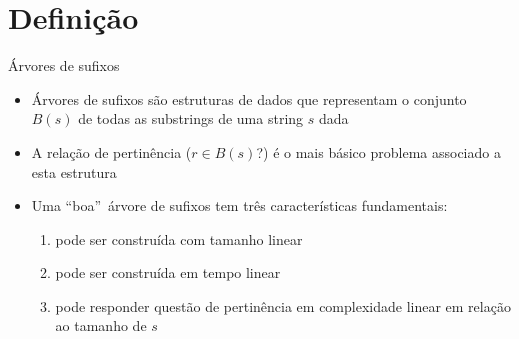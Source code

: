 \section{Definição}

\begin{frame}[fragile]{Árvores de sufixos}

    \begin{itemize}
        \item Árvores de sufixos são estruturas de dados que representam o conjunto 
            $B(s)$ de todas as substrings de uma string $s$ dada
        \pause

        \item A relação de pertinência ($r \in B(s)$?) é o mais básico problema associado a esta 
            estrutura
        \pause

        \item Uma ``boa''\ árvore de sufixos tem três características fundamentais:
        \pause

        \begin{enumerate}
            \item pode ser construída com tamanho linear
        \pause
            \item pode ser construída em tempo linear
        \pause
            \item pode responder questão de pertinência em complexidade linear em relação ao tamanho de $s$
        \end{enumerate}

    \end{itemize}

\end{frame}

